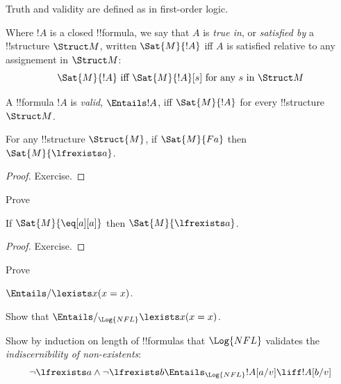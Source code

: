 \documentclass[../../../include/open-logic-section]{subfiles}
\begin{document}
Truth and validity are defined as in first-order logic.

\begin{defn}[Truth]
Where $!A$ is a closed !!{formula}, we say that $A$ is \emph{true in}, or
\emph{satisfied by} a !!{structure} $\Struct M$, written $\Sat{M}{!A}$ iff 
$A$ is satisfied relative to any assignement in $\Struct M$:
$$\Sat{M}{!A}\textrm{ iff }\Sat{M}{!A}[s]\textrm{ for any }s\textrm{ in }\Struct M$$
\end{defn}

\begin{defn}[Validity]
  A !!{formula} $!A$ is \emph{valid}, $\Entails !A$, iff $\Sat{M}{!A}$ for every
  !!{structure}~$\Struct M$.
\end{defn}

\begin{prop}
  For any  !!{structure} $\Struct{M}$, if $\Sat{M}{Fa}$ then $\Sat{M}{\lfrexists a}$.
\end{prop}

\begin{proof}
  Exercise.
\end{proof}

\begin{prob}
  Prove 
\end{prob}

\begin{prop}
  If $\Sat{M}{\eq[a][a]}$ then $\Sat{M}{\lfrexists a}$.
\end{prop}

\begin{proof}
  Exercise.
\end{proof}

\begin{prob}
  Prove 
\end{prob}

\begin{prop}
  $\Entails/ \lexists x (x = x)$.
\end{prop}

\begin{prob}
Show that $\Entails/_{\Log{NFL}} \lexists x (x = x)$.
\end{prob}

\begin{prob}
Show by induction on length of !!{formula}s that $\Log{NFL}$ validates 
the \emph{indiscernibility of non-existents}:
$$\lnot\lfrexists a\land\lnot\lfrexists b \Entails_{\Log{NFL}} 
!A[a/v]\liff !A[b/v]$$
\end{prob}
\end{document}
